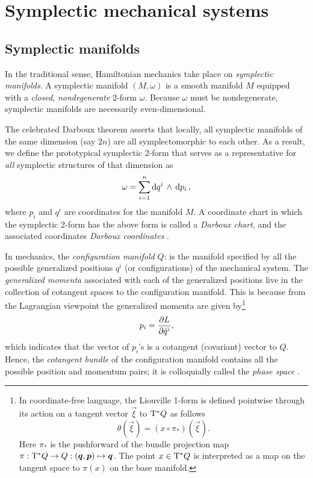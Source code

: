 \section{Symplectic mechanical systems}
\label{sec:symplectic}

\subsection{Symplectic manifolds}
In the traditional sense, Hamiltonian mechanics take place on \emph{symplectic manifolds}. A symplectic manifold \((M, \omega)\) is a smooth manifold \(M\) equipped with a \emph{closed}, \emph{nondegenerate} 2-form \(\omega\). Because \(\omega\) must be nondegenerate, symplectic manifolds are necessarily even-dimensional. 

The celebrated Darboux theorem asserts that locally, all symplectic manifolds of the same dimension (say \(2n\)) are all symplectomorphic to each other. As a result, we define the prototypical symplectic 2-form that serves as a representative for \emph{all} symplectic structures of that dimension as
\begin{equation}
    \omega = \sum_{i = 1}^n  \dd{q^i}\,\wedge\,\dd{p_i} ,
    \label{eq:darboux_symplectic_form}
\end{equation}
where \(p_i\) and \(q^i\) are coordinates for the manifold \(M\). A coordinate chart in which the symplectic 2-form has the above form is called a \emph{Darboux chart}, and the associated coordinates \emph{Darboux coordinates} \cite{Cannas2001, Arnold1989}.

In mechanics, the \emph{configuration manifold} \(Q\): is the manifold specified by all the possible generalized positions \(q^i\) (or configurations) of the mechanical system. The \emph{generalized momenta} associated with each of the generalized positions live in the collection of cotangent spaces to the configuration manifold. This is because from the Lagrangian viewpoint the generalized momenta are given by\footnote
{
    In coordinate-free language, the Liouville 1-form is defined pointwise through its action on a tangent vector \(\vec{\xi}\) to \(\mathrm{T}^*Q\) as follows
    \begin{equation}
     \theta(\vec{\xi}) = (x \circ \pi_*) (\vec{\xi}).
\end{equation}
    Here \(\pi_*\) is the pushforward of the bundle projection map \(\pi: \ctbundle{Q} \to Q: (\vec{q}, \vec{p}) \mapsto \vec{q}\). The point \(x \in \mathrm{T}^*Q\) is interpreted as a map on the tangent space to \(\pi(x)\) on the base manifold.
}
\begin{equation}
     p_i = \pdv{L}{\dot{q}^i},
\end{equation}
which indicates that the vector of \(p_i\)'s is a cotangent (covariant) vector to \(Q\). Hence, the \emph{cotangent bundle} of the configuration manifold contains all the possible position and momentum pairs; it is colloquially called the \emph{phase space} \cite{Abraham1978,Arnold1989,Libermann1987}.

